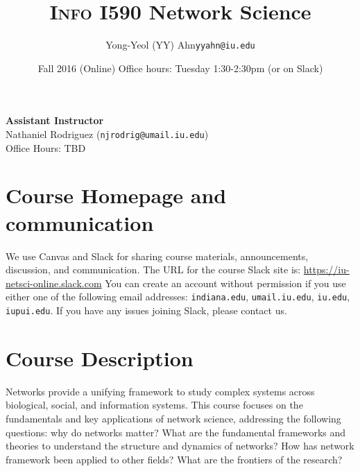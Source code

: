 \documentclass[11pt,article,oneside]{memoir}
\makeatletter
\def\myauthor{Author}
\def\mytitle{Title}
\def\myemail{yyahn@iu.edu}
\def\myauthor{Yong-Yeol (YY) Ahn}
\def\mytitle{{\normalsize \textsc{Info} I590 \newline} \HUGE Network Science}
\makeatother
\begin{document}

\def\ind{\hangindent=1 true cm\hangafter=1 \noindent}
\def\labelitemi{$\cdot$}


\title{\LARGE \mytitle}     
\author{\Large\myauthor \newline \footnotesize\texttt{\noindent\myemail}}
\date{Fall 2016 (Online) %
\newline Office hours: Tuesday 1:30-2:30pm (or on Slack)}

\maketitle

\vspace{-20pt}
{\bfseries Assistant Instructor} \\ Nathaniel Rodriguez (\texttt{njrodrig@umail.iu.edu}) \\ Office Hours: TBD

\section{Course Homepage and communication}

We use Canvas and Slack for sharing course materials, announcements,
discussion, and communication. The URL for the course Slack site is:
\url{https://iu-netsci-online.slack.com} You can create an account without
permission if you use either one of the following email addresses:
\texttt{indiana.edu}, \texttt{umail.iu.edu}, \texttt{iu.edu},
\texttt{iupui.edu}. If you have any issues joining Slack, please contact us. 


\section{Course Description}

Networks provide a unifying framework to study complex systems across
biological, social, and information systems. This course focuses on the
fundamentals and key applications of network science, addressing the following
questions: why do networks matter? What are the fundamental frameworks and
theories to understand the structure and dynamics of networks?  How has network
framework been applied to other fields? What are the frontiers of the research?
\end{document}
